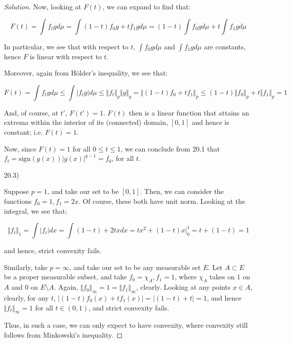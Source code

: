 \documentclass[10pt]{article}
\begin{document}
\begin{proof}[Solution]
Now, looking at $F(t)$, we can expand to find that:

$$ F(t) = \int f_t g d\mu = \int (1-t) f_0 g + t f_1 g d\mu = (1-t) \int f_0 g d\mu + t \int f_1 g d\mu $$

In particular, we see that with respect to $t$, $\int f_0 g d\mu$ and $\int f_1 g d\mu$ are constants, hence $F$ is linear with respect to $t$.

Moreover, again from H\"older's inequality, we see that:

$$ F(t) =  \int f_t g d\mu \leq \int |f_t g | d\mu \leq \Vert f_t\Vert_p \Vert g\Vert_q = \Vert (1-t)f_0 + t f_1 \Vert_p \leq (1-t) \Vert f_0 \Vert_p + t \Vert f_1 \Vert_p = 1 $$

And, of course, at $t'$, $F(t') = 1$. $F(t)$ then is a linear function that attains an extrema within the interior of its (connected) domain, $[0,1]$ and hence is constant; i.e. $F(t) = 1$.

Now, since $F(t) = 1$ for all $0 \leq t \leq 1$, we can conclude from 20.1 that $f_t = \text{sign}(g(x)) | g(x) |^{q-1} = f_0$, for all $t$.

20.3)

Suppose $p=1$, and take our set to be $[0,1]$. Then, we can consider the functions $f_0 = 1, f_1 = 2x$. Of course, these both have unit norm. Looking at the integral, we see that:

$$ \Vert f_t \Vert_1 = \int |f_t| dx = \int (1-t) + 2tx dx = tx^2 + (1-t)x |_{0}^1 = t + (1-t) = 1$$

and hence, strict convexity fails.

Similarly, take $p = \infty$, and take our set to be any measurable set $E$. Let $A \subset E$ be a proper measurable subset, and take $f_0 = \chi_A, f_1 = 1$, where $\chi_A$ takes on $1$ on $A$ and $0$ on $E \setminus A$. Again, $\Vert f_0 \Vert_{\infty} = 1 = \Vert f_1 \Vert_\infty$, clearly. Looking at any points $x \in A$, clearly, for any $t$, $| (1-t)f_0(x) + tf_1(x) | = | (1-t) + t | = 1$, and hence $\Vert f_t \Vert_\infty = 1$ for all $t \in (0,1)$, and strict convexity fails. 

Thus, in such a case, we can only expect to have convexity, where convexity still follows from Minkowski's inequality.


\end{proof}
\end{document}
